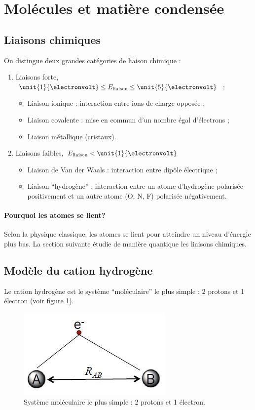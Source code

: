 
\section{Molécules et matière condensée}
\subsection{Liaisons chimiques}
On distingue deux grandes catégories de
liaison chimique :
\begin{enumerate}
	\item Liaisons forte, $\unit{1}{\electronvolt} \leq E_{\text{liaison}} \leq \unit{5}{\electronvolt}$ :
	\begin{itemize}
		\item Liaison ionique : interaction entre ions de charge opposée ;
		\item Liaison covalente : mise en commun d'un nombre égal d'électrons ;
		\item Liaison métallique (cristaux).
	\end{itemize}
	\item Liaisons faibles, $E_{\text{liaison}} < \unit{1}{\electronvolt}$
	\begin{itemize}
		\item Liaison de Van der Waals : interaction entre dipôle électrique ;
		\item Liaison ``hydrogène'' : interaction entre un atome d'hydrogène polarisée
		positivement et un autre atome (O, N, F) polarisée négativement.
	\end{itemize}
\end{enumerate}

\paragraph{Pourquoi les atomes se lient?}
Selon la physique classique, les atomes se lient
pour atteindre un niveau d'énergie plus bas.
La section suivante étudie de manière quantique
les liaisons chimiques.

\subsection{Modèle du cation hydrogène}
Le cation hydrogène est le système ``moléculaire''
le plus simple : 2 protons et 1 électron (voir figure 
\ref{fig:cation-h2}).

\begin{figure}[ht]
	\centering
	\includegraphics{img/cation_h2.jpg}
	\caption{Système moléculaire le plus simple : 2 protons
	et 1 électron.}
	\label{fig:cation-h2}
\end{figure}


